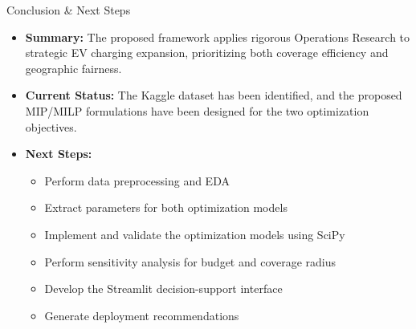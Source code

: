 \documentclass[aspectratio=169,10pt]{beamer}
\begin{document}
\begin{frame}{Conclusion \& Next Steps}

\vspace{0.15cm}

\begin{itemize}

    \item \textbf{Summary:} The proposed framework applies rigorous Operations Research to strategic EV charging expansion, prioritizing both coverage efficiency and geographic fairness.

    \vspace{0.2cm}

    \item \textbf{Current Status:} The Kaggle dataset has been identified, and the proposed MIP/MILP formulations have been designed for the two optimization objectives.

    \vspace{0.2cm}

    \item \textbf{Next Steps:}
    \begin{itemize}
        \item Perform data preprocessing and EDA
        \item Extract parameters for both optimization models
        \item Implement and validate the optimization models using SciPy
        \item Perform sensitivity analysis for budget and coverage radius
        \item Develop the Streamlit decision-support interface
        \item Generate deployment recommendations
    \end{itemize}

\end{itemize}

\end{frame}
\end{document}
